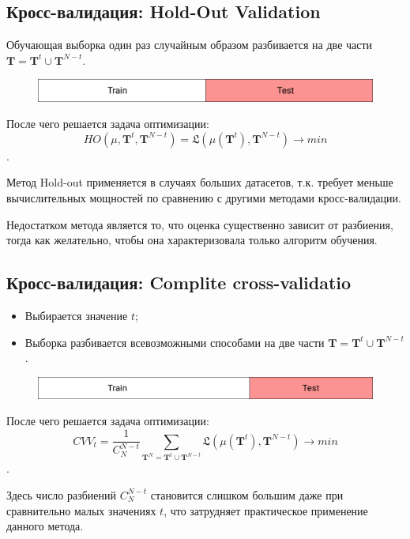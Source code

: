 \documentclass[11pt, oneside]{article}   	%
\begin{document}
\subsection{Кросс-валидация: Hold-Out Validation}

Обучающая выборка один раз случайным образом разбивается на две части $\bm{T} = \bm{T}^t \cup \bm{T}^{N-t}$.


\begin{figure}[h]
	\includegraphics[width=0.9\linewidth]{imgs/hold-out}
\end{figure}

После чего решается задача оптимизации:
$$ HO(\mu, \bm{T}^t, \bm{T}^{N-t}) = \mathfrak{L}(\mu(\bm{T}^t), \bm{T}^{N-t}) \rightarrow min $$.


Метод Hold-out применяется в случаях больших датасетов, т.к. требует меньше вычислительных мощностей по сравнению с другими методами кросс-валидации. 

Недостатком метода является то, что оценка существенно зависит от разбиения, тогда как желательно, чтобы она характеризовала только алгоритм обучения.

\subsection{Кросс-валидация: Complite cross-validatio}

\begin{itemize}
	\item Выбирается значение $t$;
	\item Выборка разбивается всевозможными способами на две части $\bm{T} = \bm{T}^t \cup \bm{T}^{N-t}$.
\end{itemize}
\begin{figure}[h]
	\includegraphics[width=1\linewidth]{imgs/completecrossvalidation}
\end{figure}
После чего решается задача оптимизации:
$$ CVV_t = \frac{1}{C_N^{N-t}}\sum\limits_{\bm{T}^N = \bm{T}^t \cup \bm{T}^{N-t}} \mathfrak{L}(\mu(\bm{T}^t), \bm{T}^{N-t}) \rightarrow min $$.


Здесь число разбиений $ C_N^{N-t} $ становится слишком большим даже при сравнительно малых значениях $ t $, что затрудняет практическое применение данного метода.
\end{document}
